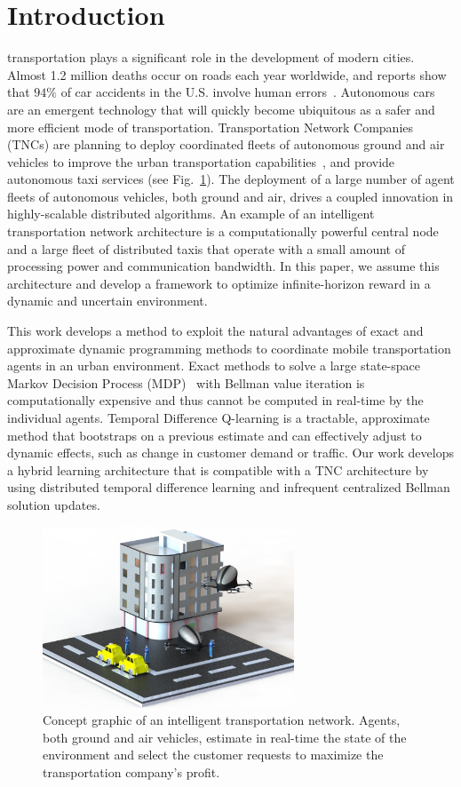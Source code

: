 \documentclass[journal]{IEEEtran}
\begin{document}
\newpage 

\section{Introduction}
 transportation plays a significant role in the development of modern cities. Almost 1.2 million deaths occur on roads each year worldwide, and reports show that $94\%$ of car accidents in the U.S. involve human errors~\cite{Google}. Autonomous cars are an emergent technology that will quickly become ubiquitous as a safer and more efficient mode of transportation. Transportation Network Companies (TNCs) are planning to deploy coordinated fleets of autonomous ground and air vehicles to improve the urban transportation capabilities~\cite{Uber}, and provide autonomous taxi services (see Fig.~\ref{overview_graphic_v2}). The deployment of a large number of agent fleets of autonomous vehicles, both ground and air, drives a coupled innovation in highly-scalable distributed algorithms. An example of an intelligent transportation network architecture is a computationally powerful central node and a large fleet of distributed taxis that operate with a small amount of processing power and communication bandwidth. In this paper, we assume this architecture and develop a framework to optimize infinite-horizon reward in a dynamic and uncertain environment.

This work develops a method to exploit the natural advantages of exact and approximate dynamic programming methods to coordinate mobile transportation agents in an urban environment. Exact methods to solve a large state-space Markov Decision Process (MDP)~\cite{bellman1957,putermanMPI} with Bellman value iteration is computationally expensive and thus cannot be computed in real-time by the individual agents. Temporal Difference Q-learning is a tractable, approximate method that bootstraps on a previous estimate and can effectively adjust to dynamic effects, such as change in customer demand or traffic. Our work develops a hybrid learning architecture that is compatible with a TNC architecture by using distributed temporal difference learning and infrequent centralized Bellman solution updates. 
\begin{figure}
\begin{center}
\includegraphics[width=75mm]{graphic_v3_new.jpg}
\caption{Concept graphic of an intelligent transportation network. Agents, both ground and air vehicles, estimate in real-time the state of the environment and select the customer requests to maximize the transportation company's profit.}
\label{overview_graphic_v2}
\end{center}
\end{figure}
\end{document}
